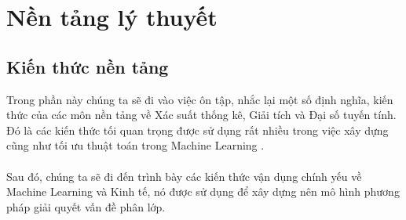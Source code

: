 \chapter{Nền tảng lý thuyết}
\section{Kiến thức nền tảng}
Trong phần này chúng ta sẽ đi vào việc ôn tập, nhắc lại một số định nghĩa, kiến
thức của các môn nền tảng về Xác suất thống kê, Giải tích và Đại số tuyến tính.
Đó là các kiến thức tối quan trọng được sử dụng rất nhiều trong việc xây dựng
cũng như tối ưu thuật toán trong Machine Learning \cite{MachineLearningLec, MachineLearningSec}. \\\\  
Sau đó, chúng ta sẽ đi đến trình bày các kiến thức vận dụng chính yếu về 
Machine Learning và Kinh tế, nó được sử dụng để xây dựng nên mô hình phương 
pháp giải quyết vấn đề phân lớp.
